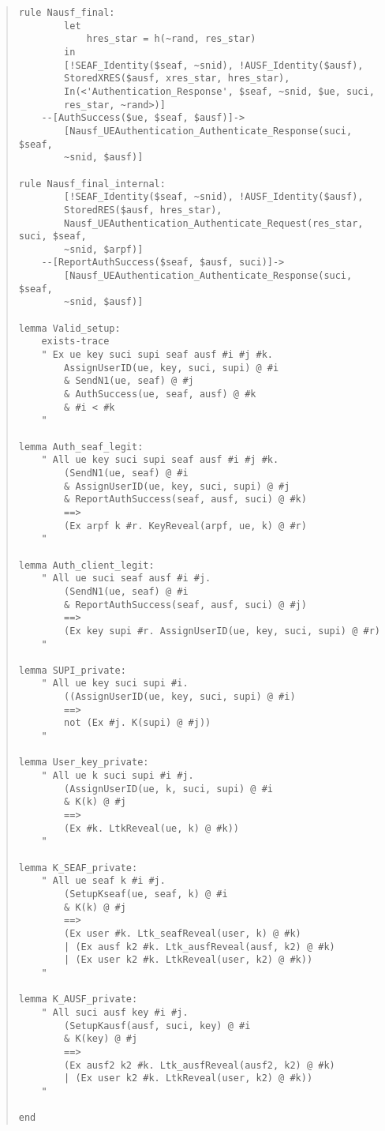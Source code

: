 \documentclass[10pt, pdftex]{article}
\begin{document}
\begin{quote}
\begin{verbatim}
rule Nausf_final:
		let
			hres_star = h(~rand, res_star)
		in
		[!SEAF_Identity($seaf, ~snid), !AUSF_Identity($ausf),
		StoredXRES($ausf, xres_star, hres_star),
		In(<'Authentication_Response', $seaf, ~snid, $ue, suci,
		res_star, ~rand>)]
	--[AuthSuccess($ue, $seaf, $ausf)]->
		[Nausf_UEAuthentication_Authenticate_Response(suci, $seaf,
		~snid, $ausf)]

rule Nausf_final_internal:
		[!SEAF_Identity($seaf, ~snid), !AUSF_Identity($ausf),
		StoredRES($ausf, hres_star),
		Nausf_UEAuthentication_Authenticate_Request(res_star, suci, $seaf,
		~snid, $arpf)]
	--[ReportAuthSuccess($seaf, $ausf, suci)]->
		[Nausf_UEAuthentication_Authenticate_Response(suci, $seaf,
		~snid, $ausf)]

lemma Valid_setup:
	exists-trace
	" Ex ue key suci supi seaf ausf #i #j #k.
		AssignUserID(ue, key, suci, supi) @ #i
		& SendN1(ue, seaf) @ #j
		& AuthSuccess(ue, seaf, ausf) @ #k
		& #i < #k
	"

lemma Auth_seaf_legit:
	" All ue key suci supi seaf ausf #i #j #k.
		(SendN1(ue, seaf) @ #i
		& AssignUserID(ue, key, suci, supi) @ #j
		& ReportAuthSuccess(seaf, ausf, suci) @ #k)
		==>
		(Ex arpf k #r. KeyReveal(arpf, ue, k) @ #r)
	"

lemma Auth_client_legit:
	" All ue suci seaf ausf #i #j.
		(SendN1(ue, seaf) @ #i
		& ReportAuthSuccess(seaf, ausf, suci) @ #j)
		==>
		(Ex key supi #r. AssignUserID(ue, key, suci, supi) @ #r)
	"

lemma SUPI_private:
	" All ue key suci supi #i.
		((AssignUserID(ue, key, suci, supi) @ #i)
		==>
		not (Ex #j. K(supi) @ #j))
	"

lemma User_key_private:
	" All ue k suci supi #i #j.
		(AssignUserID(ue, k, suci, supi) @ #i
		& K(k) @ #j
		==>
		(Ex #k. LtkReveal(ue, k) @ #k))
	"

lemma K_SEAF_private:
	" All ue seaf k #i #j.
		(SetupKseaf(ue, seaf, k) @ #i
		& K(k) @ #j
		==>
		(Ex user #k. Ltk_seafReveal(user, k) @ #k)
		| (Ex ausf k2 #k. Ltk_ausfReveal(ausf, k2) @ #k)
		| (Ex user k2 #k. LtkReveal(user, k2) @ #k))
	"

lemma K_AUSF_private:
	" All suci ausf key #i #j.
		(SetupKausf(ausf, suci, key) @ #i
		& K(key) @ #j
		==>
		(Ex ausf2 k2 #k. Ltk_ausfReveal(ausf2, k2) @ #k)
		| (Ex user k2 #k. LtkReveal(user, k2) @ #k))
	"

end
	\end{verbatim}
\end{quote}
\end{document}

